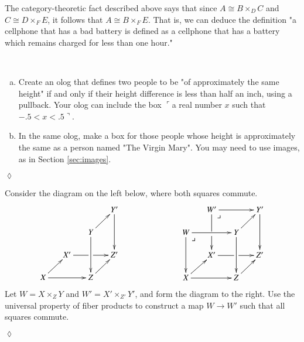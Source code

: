 \documentclass{book}
\makeatletter
\def\tn{\textnormal}
\def\to{\rightarrow}
\def\iso{\cong}
\newcommand{\fakebox}[1]{\tn{$\ulcorner$#1$\urcorner$}}
\def\ullimit{\ar@{}[rd]|(.3)*+{\lrcorner}}
\theoremstyle{theoremENG}
\theoremstyle{lemmaENG}
\theoremstyle{propositionENG}
\theoremstyle{corollaryENG}
\theoremstyle{factENG}
\theoremstyle{remarkENG}
\theoremstyle{exampleENG}
\theoremstyle{warningENG}
\theoremstyle{questionENG}
\theoremstyle{guessENG}
\theoremstyle{answerENG}
\theoremstyle{constructionENG}
\theoremstyle{rulesENG}
\theoremstyle{excENG}
\newtheorem{excENG}[subsubsection]{\begin{english}Exercise\end{english}}
\theoremstyle{appENG}
\theoremstyle{definitionENG}
\theoremstyle{notationENG}
\theoremstyle{conjectureENG}
\theoremstyle{postulateENG}
\newenvironment{exerciseENG}{\begin{excENG}}{\hspace*{\fill}$\lozenge$\end{excENG}}
\theoremstyle{theoremRUS}
\theoremstyle{lemmaRUS}
\theoremstyle{propositionRUS}
\theoremstyle{corollaryRUS}
\theoremstyle{factRUS}
\theoremstyle{remarkRUS}
\theoremstyle{exampleRUS}
\theoremstyle{warningRUS}
\theoremstyle{questionRUS}
\theoremstyle{guessRUS}
\theoremstyle{answerRUS}
\theoremstyle{constructionRUS}
\theoremstyle{rulesRUS}
\theoremstyle{excRUS}
\theoremstyle{appRUS}
\theoremstyle{definitionRUS}
\theoremstyle{notationRUS}
\theoremstyle{conjectureRUS}
\theoremstyle{postulateRUS}
\def\sexc{\begin{enumerate}[a.)]\setlength{\itemsep}{.1cm}\setlength{\parskip}{.1cm}\item}
\def\next{\item}
\def\endsexc{\end{enumerate}}
\makeatother
\begin{document}
\begin{english}
\begin{russian} \end{russian}

The category-theoretic fact described above says that since $A\iso B\times_DC$ and $C\iso D\times_FE$, it follows that $A\iso B\times_FE$.  That is, we can deduce the definition "a cellphone that has a bad battery is defined as a cellphone that has a battery which remains charged for less than one hour."  

\begin{russian} \end{russian}

\begin{exerciseENG}~

\sexc Create an olog that defines two people to be "of approximately the same height" if and only if their height difference is less than half an inch, using a pullback. Your olog can include the box \fakebox{a real number $x$ such that $-.5<x<.5$}. 
\next In the same olog, make a box for those people whose height is approximately the same as a person named "The Virgin Mary". You may need to use images, as in Section \ref{sec:images}.
\endsexc

\begin{russian} \end{russian}

\end{exerciseENG}

\begin{exerciseENG}\label{exc:pointwise map of fp}

Consider the diagram on the left below, where both squares commute. 
$$
\xymatrix@=15pt{
&&&Y'\ar[dd]\\
&&Y\ar[ru]\ar[dd]\\
&X'\ar'[r][rr]&&Z'\\
X\ar[rr]\ar[ru]&&Z\ar[ru]
}
\hspace{1in}
\xymatrix@=15pt{
&W'\ar[rr]\ar'[d][dd]\ullimit&&Y'\ar[dd]\\
W\ar[rr]\ar[dd]\ullimit&&Y\ar[ru]\ar[dd]\\
&X'\ar'[r][rr]&&Z'\\
X\ar[rr]\ar[ru]&&Z\ar[ru]
}
$$
Let $W=X\times_ZY$ and $W'=X'\times_{Z'}Y'$, and form the diagram to the right. Use the universal property of fiber products to construct a map $W\to W'$ such that all squares commute.

\begin{russian} \end{russian}


\end{exerciseENG}
\end{english}
\end{document}
